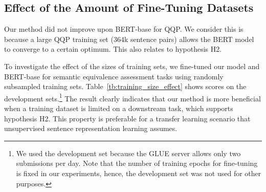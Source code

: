 \documentclass[11pt,a4paper]{article}
\newcommand{\Tref}[1]{Table~\ref{#1}}
\begin{document}
\subsection{Effect of the Amount of Fine-Tuning Datasets}
\label{sec:train_size}
\begin{table}[!t]
\centering
{}
\caption{Development set scores of the BERT-base model and our model (and their differences) that were fine-tuned using subsamples and full-size training sets.}
\label{tb:training_size_effect}
\end{table}

Our method did not improve upon BERT-base for QQP. 
We consider this is because a large QQP training set ($364$k sentence pairs) allows the BERT model to converge to a certain optimum. 
This also relates to hypothesis H2. 


To investigate the effect of the sizes of training sets, we fine-tuned our model and BERT-base for semantic equivalence assessment tasks using randomly subsampled training sets.  
\Tref{tb:training_size_effect} shows scores on the development sets.\footnote{We used the development set because the GLUE server allows only two submissions per day. Note that the number of training epochs for fine-tuning is fixed in our experiments, hence, the development set was not used for other purposes.}
The result clearly indicates that our method is more beneficial when a training dataset is limited on a downstream task, which supports hypothesis H2. 
This property is preferable for a transfer learning scenario that unsupervised sentence representation learning assumes. 
\end{document}
